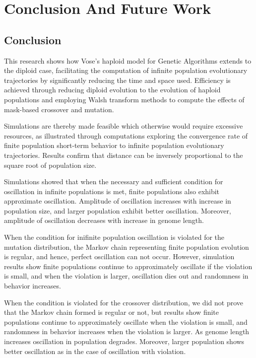 \chapter{Conclusion And Future Work}
\section{Conclusion}
This research shows how Vose's haploid model for Genetic Algorithms
extends to the diploid case, facilitating the computation of infinite
population evolutionary trajectories by significantly reducing the
time and space used.  Efficiency is achieved through reducing diploid evolution 
to the evolution of haploid populations
and employing Walsh transform methods to compute the effects of
mask-based crossover and mutation.  

Simulations are thereby made feasible which otherwise would require
excessive resources, as illustrated through computations exploring 
the convergence rate of finite population short-term behavior to infinite population evolutionary trajectories. 
Results confirm that distance can be inversely proportional to the square root of population size.

Simulations showed that when the necessary and sufficient condition for oscillation in infinite populations is met, 
finite populations also exhibit approximate oscillation. Amplitude of oscillation increases with 
increase in population size, and larger population exhibit better oscillation. Moreover, amplitude of 
oscillation decreases with increase in genome length.

When the condition for inifinite population oscillation is violated for the mutation distribution, 
the Markov chain representing finite population evolution is regular, and hence, 
perfect oscillation can not occur. However, simulation results show 
finite populations continue to approximately oscillate if the violation is small, 
and when the violation is larger, oscillation dies out and randomness in behavior increases. 

When the condition is violated for the crossover distribution,
we did not prove that the Markov chain formed is regular or not, 
but results show finite populations continue to approximately oscillate 
when the violation is small, and randomness in behavior increases when the violation is larger. 
As genome length increases oscillation in population degrades. 
Moreover, larger population shows better oscillation 
as in the case of oscillation with violation.

